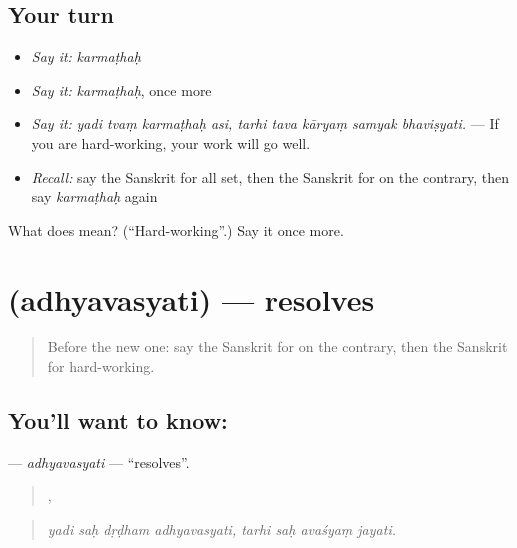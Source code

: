\subsection*{Your turn}
\begin{itemize}
\raggedright
  \item \emph{Say it:} \emph{karmaṭhaḥ}
  \item \emph{Say it:} \emph{karmaṭhaḥ}, once more
  \item \emph{Say it:} \emph{yadi tvaṃ karmaṭhaḥ asi, tarhi tava kāryaṃ samyak bhaviṣyati.} — If you are hard-working, your work will go well.
  \item \emph{Recall:} say the Sanskrit for all set, then the Sanskrit for on the contrary, then say \emph{karmaṭhaḥ} again
\end{itemize}

\begin{tcolorbox}[breakable,colback=teal!4,colframe=teal!35!black,title={Before you move on}]
What does  mean? (\textquotedblleft{}Hard-working\textquotedblright{}.) Say it once more.
\end{tcolorbox}
\section[\texorpdfstring{\sk{अध्यवस्यति} (adhyavasyati)}{अध्यवस्यति (adhyavasyati)}]{ (adhyavasyati) — resolves}

\label{lesson:SA-C555-adhyavasyati}



\begin{quote}
Before the new one: say the Sanskrit for on the contrary, then the Sanskrit for hard-working.
\end{quote}

\subsection*{You'll want to know: }
\textbf{} — \emph{adhyavasyati} — \textquotedblleft{}resolves\textquotedblright{}.

\begin{quote}
   ,    
\end{quote}

\begin{quote}
\emph{yadi saḥ dṛḍham adhyavasyati, tarhi saḥ avaśyaṃ jayati.}
\end{quote}

